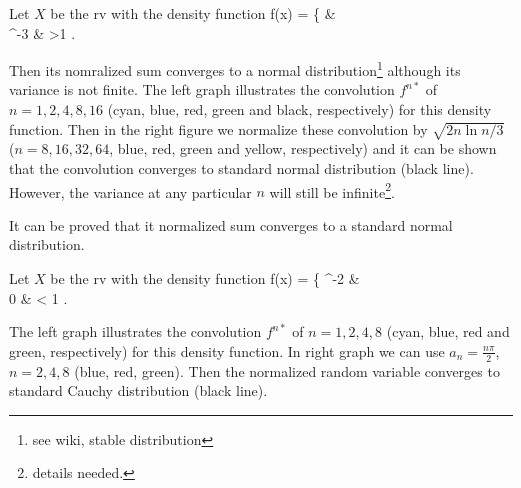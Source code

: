 \begin{example}
Let $X$ be the rv with the density function
\be
f(x) = \left\{
 &  \\
 ^{-3} \quad\quad & >1
\ea\right.
\ee

Then its nomralized sum converges to a normal distribution\footnote{see wiki, stable distribution} although its variance is not finite. The left graph illustrates the convolution $f^{n*}$ of $n=1,2,4,8,16$ (cyan, blue, red, green and black, respectively) for this density function. Then in the right figure we normalize these convolution by $\sqrt{2n\ln n /3}$ ($n=8,16,32,64$, blue, red, green and yellow, respectively) and it can be shown that the convolution converges to standard normal distribution (black line). However, the variance at any particular $n$ will still be infinite\footnote{details needed.}.
\begin{figure}[thb]
\centering
{}
\hspace{-1cm}
\end{figure}

It can be proved that it normalized sum converges to a standard normal distribution.
\end{example}

\begin{example}

Let $X$ be the rv with the density function
\be
f(x) = \left\{
 ^{-2} \quad\quad &  \\
0  & < 1
\ea\right.
\ee

The left graph illustrates the convolution $f^{n*}$ of $n=1,2,4,8$ (cyan, blue, red and green, respectively) for this density function. In right graph
we can use $a_n = \frac{n\pi}{2}$, $n=2,4,8$ (blue, red, green). Then the normalized random variable converges to standard Cauchy distribution (black line).

\begin{figure}[thb]
\centering
{}
\hspace{-1cm}
\end{figure}
\end{example}


